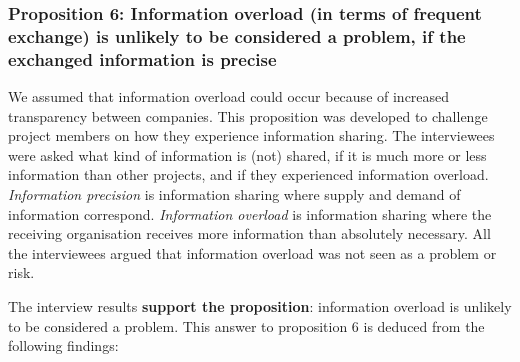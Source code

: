 \vspace{.2cm}
\subsubsection{Proposition 6: Information overload (in terms of frequent exchange) is unlikely to be considered a problem, if the exchanged information is precise}


We assumed that information overload could occur because of increased transparency between companies. This proposition was developed to challenge project members on how they experience information sharing. The interviewees were asked what kind of information is (not) shared, if it is much more or less information than other projects, and if they experienced information overload. {\em Information precision} is information sharing where supply and demand of information correspond. {\em Information overload} is information sharing where the receiving organisation receives more information than absolutely necessary. All the interviewees argued that information overload was not seen as a problem or risk.


%

The interview results {\bf support the proposition}: information overload is unlikely to be considered a problem. This answer to proposition 6 is deduced from the following findings:

